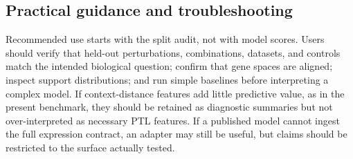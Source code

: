\subsection{Practical guidance and troubleshooting}

Recommended use starts with the split audit, not with model scores. Users should verify that held-out perturbations, combinations, datasets, and controls match the intended biological question; confirm that gene spaces are aligned; inspect support distributions; and run simple baselines before interpreting a complex model. If context-distance features add little predictive value, as in the present benchmark, they should be retained as diagnostic summaries but not over-interpreted as necessary PTL features. If a published model cannot ingest the full expression contract, an adapter may still be useful, but claims should be restricted to the surface actually tested.
